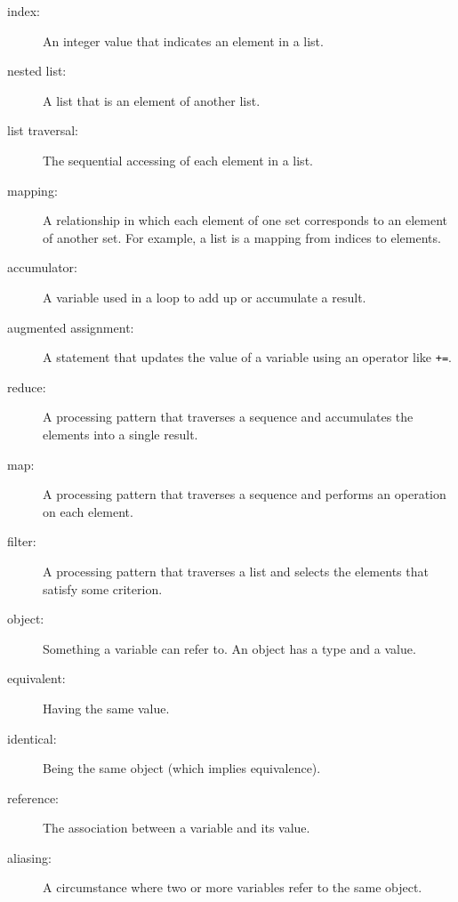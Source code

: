 \documentclass[10pt]{book}
\begin{document}
\begin{CJK}{UTF8}{gbsn}
\begin{description}
\item[index:] An integer value that indicates an element in a list.

\item[nested list:] A list that is an element of another list.

\item[list traversal:] The sequential accessing of each element in a list.

\item[mapping:] A relationship in which each element of one set
corresponds to an element of another set.  For example, a list is
a mapping from indices to elements.

\item[accumulator:] A variable used in a loop to add up or
accumulate a result.

\item[augmented assignment:] A statement that updates the value
of a variable using an operator like \verb"+=".

\item[reduce:] A processing pattern that traverses a sequence 
and accumulates the elements into a single result.

\item[map:] A processing pattern that traverses a sequence and
performs an operation on each element.

\item[filter:] A processing pattern that traverses a list and
selects the elements that satisfy some criterion.

\item[object:] Something a variable can refer to.  An object
has a type and a value.

\item[equivalent:] Having the same value.

\item[identical:] Being the same object (which implies equivalence).

\item[reference:] The association between a variable and its value.

\item[aliasing:] A circumstance where two or more variables refer to the same
object.


\end{description}
\end{CJK}
\end{document}
